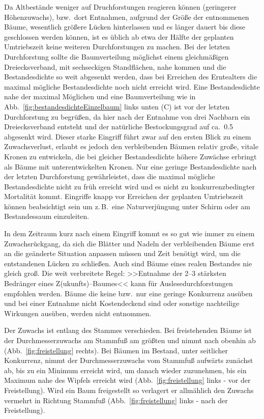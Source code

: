 \documentclass[twocolumn]{scrartcl}
\begin{document}
Da Altbestände weniger auf Druchforstungen reagieren können (geringerer
Höhenzuwachs), bzw.\ dort Entnahmen, aufgrund der Größe der entnommenen Bäume,
wesentlich größere Lücken hinterlassen und es länger dauert bis diese
geschlossen werden können, ist es üblich ab etwa der Hälfte der geplanten
Umtriebszeit keine weiteren Durchforstungen zu machen. Bei der letzten
Durchforstung sollte die Baumverteilung möglichst einem gleichmäßigen
Dreiecksverband, mit sechseckigen Standflächen, nahe kommen und die
Bestandesdichte so weit abgesenkt werden, dass bei Erreichen des Erntealters die
maximal mögliche Bestandesdichte noch nicht erreicht wird. Eine Bestandesdichte
nahe der maximal Möglichen und eine Baumverteilung wie in
Abb.~\ref{fig:bestandesdichteEinzelbaum} links unten (C) ist vor der letzten
Durchforstung zu begrüßen, da hier nach der Entnahme von drei Nachbarn ein
Dreiecksverband entsteht und der natürliche Bestockungsgrad auf ca.\ 0.5
abgesenkt wird. Dieser starke Eingriff führt zwar auf den ersten Blick zu einem
Zuwachsverlust, erlaubt es jedoch den verbleibenden Bäumen relativ große, vitale
Kronen zu entwickeln, die bei gleicher Bestandesdichte höhere Zuwächse erbringt
als Bäume mit unterentwickelten Kronen. Nur eine geringe Bestandesdichte nach
der letzten Durchforstung gewährleistet, dass die maximal mögliche
Bestandesdichte nicht zu früh erreicht wird und es nicht zu konkurrenzbedingter
Mortalität kommt. Eingriffe knapp vor Erreichen der geplanten Umtriebszeit
können beabsichtigt sein um z.\,B.\ eine Naturverjüngung unter Schirm oder am
Bestandessaum einzuleiten.

In dem Zeitraum kurz nach einem Eingriff kommt es so gut wie immer zu einem
Zuwachsrückgang, da sich die Blätter und Nadeln der verbleibenden Bäume erst an
die geänderte Situation anpassen müssen und Zeit benötigt wird, um die
entstandenen Lücken zu schließen. Auch sind Bäume eines realen Bestandes nie
gleich groß. Die weit verbreitete Regel: >>Entnahme der 2--3 stärksten Bedränger
eines Z(ukunfts)--Baumes<< kann für Auslesedurchforstungen empfohlen werden.
Bäume die keine bzw.\ nur eine geringe Konkurrenz ausüben und bei einer Entnahme
nicht Kostendeckend sind oder sonstige nachteilige Wirkungen ausüben, werden
nicht entnommen.

Der Zuwachs ist entlang des Stammes verschieden. Bei freistehenden Bäume ist der
Durchmesserzuwachs am Stammfuß am größten und nimmt nach obenhin ab
(Abb.~\ref{fig:freistellung} rechts). Bei Bäumen im Bestand, unter seitlicher
Konkurrenz, nimmt der Durchmesserzuwachs vom Stammfuß aufwärts zunächst ab, bis
zu ein Minimum erreicht wird, um danach wieder zuzunehmen, bis ein Maximum nahe
des Wipfels erreicht wird (Abb.~\ref{fig:freistellung} links - vor der
Freistellung). Wird ein Baum freigestellt so verlagert er allmählich den Zuwachs
vermehrt in Richtung Stammfuß (Abb.~\ref{fig:freistellung} links - nach der
Freistellung).
\end{document}
